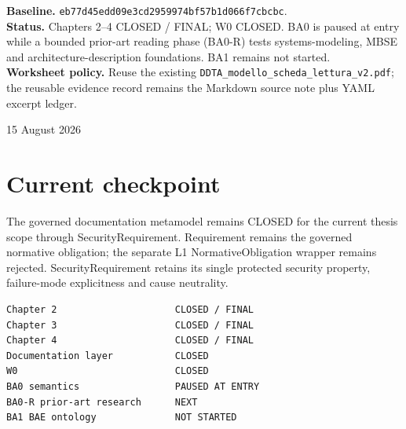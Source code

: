 \documentclass[11pt,a4paper]{article}
\begin{document}
\begin{titlepage}\centering\vspace*{1.8cm}{\Large Documentation-Driven Threat Analysis\par}\vspace{0.8cm}{\Huge\bfseries Research Work Plan\par}\vspace{0.3cm}{\LARGE After documentation-layer closure -- Revision 3\par}\vspace{0.9cm}{\large Systems-modeling prior-art gate before Base Analysis closure\par}\vfill\begin{minipage}{0.86\textwidth}\small
\textbf{Baseline.} \texttt{eb77d45edd09e3cd2959974bf57b1d066f7cbcbc}.\\[0.45em]
\textbf{Status.} Chapters 2--4 CLOSED / FINAL; W0 CLOSED. BA0 is paused at entry while a bounded prior-art reading phase (BA0-R) tests systems-modeling, MBSE and architecture-description foundations. BA1 remains not started.\\[0.45em]
\textbf{Worksheet policy.} Reuse the existing \texttt{DDTA\_modello\_scheda\_lettura\_v2.pdf}; the reusable evidence record remains the Markdown source note plus YAML excerpt ledger.
\end{minipage}\vfill{\large 15 August 2026\par}\end{titlepage}
\tableofcontents\newpage

\section{Current checkpoint}
The governed documentation metamodel remains CLOSED for the current thesis scope through SecurityRequirement. Requirement remains the governed normative obligation; the separate L1 NormativeObligation wrapper remains rejected. SecurityRequirement retains its single protected security property, failure-mode explicitness and cause neutrality.
\begin{lstlisting}
Chapter 2                     CLOSED / FINAL
Chapter 3                     CLOSED / FINAL
Chapter 4                     CLOSED / FINAL
Documentation layer           CLOSED
W0                            CLOSED
BA0 semantics                 PAUSED AT ENTRY
BA0-R prior-art research      NEXT
BA1 BAE ontology              NOT STARTED
\end{lstlisting}
\end{document}
